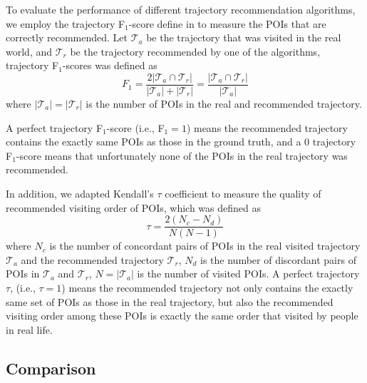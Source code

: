 To evaluate the performance of different trajectory recommendation algorithms,
we employ the trajectory F$_1$-score define in \cite{ijcai15} to measure the POIs that are 
correctly recommended. Let $\mathcal{T}_a$ be the trajectory that was visited in the real world,
and $\mathcal{T}_r$ be the trajectory recommended by one of the algorithms,
trajectory F$_1$-scores was defined as
\begin{displaymath}
    F_1 = \frac{2 |\mathcal{T}_a \cap \mathcal{T}_r|}{|\mathcal{T}_a| + |\mathcal{T}_r|} = 
          \frac{|\mathcal{T}_a \cap \mathcal{T}_r|}{|\mathcal{T}_a|}
\end{displaymath}
where $|\mathcal{T}_a| = |\mathcal{T}_r|$ is the number of POIs in the real and recommended trajectory.

A perfect trajectory F$_1$-score (i.e., F$_1 = 1$) means the recommended trajectory contains the exactly 
same POIs as those in the ground truth, and a $0$ trajectory F$_1$-score means that unfortunately none of 
the POIs in the real trajectory was recommended.

In addition, we adapted Kendall's $\tau$ coefficient \cite{kendalltau} to measure the quality of 
recommended visiting order of POIs, which was defined as
\begin{displaymath}
    \tau = \frac{2(N_c - N_d)}{N(N-1)}
\end{displaymath}
where $N_c$ is the number of concordant pairs of POIs in the real visited trajectory $\mathcal{T}_a$ and 
the recommended trajectory $\mathcal{T}_r$, $N_d$ is the number of discordant pairs of POIs in 
$\mathcal{T}_a$ and $\mathcal{T}_r$, $N = |\mathcal{T}_a|$ is the number of visited POIs.
A perfect trajectory $\tau$, (i.e., $\tau = 1$) means the recommended trajectory not only contains the exactly 
same set of POIs as those in the real trajectory, but also the recommended visiting order among these POIs is 
exactly the same order that visited by people in real life.

\subsection{Comparison}
\label{experiment:comparison}

